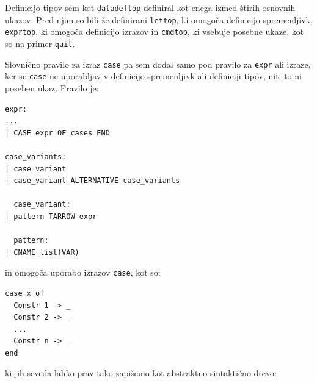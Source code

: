 \documentclass[a4paper,12pt,openright]{book}
\begin{document}
Definicijo tipov sem kot \lstinline{datadeftop} definiral kot enega izmed štirih osnovnih ukazov. Pred njim so bili že definirani \lstinline{lettop}, ki omogoča definicijo 
spremenljivk, \lstinline{exprtop}, ki omogoča definicijo izrazov in \lstinline{cmdtop}, ki vsebuje posebne ukaze, kot so na primer \lstinline{quit}.

Slovnično pravilo za izraz \lstinline{case} pa sem dodal samo pod pravilo za \lstinline{expr} ali izraze, ker se \lstinline{case} ne uporabljav v definicijo spremenljivk ali
definiciji tipov, niti to ni poseben ukaz. Pravilo je: 
\begin{lstlisting}
expr:
...
| CASE expr OF cases END

case_variants:
| case_variant
| case_variant ALTERNATIVE case_variants

  case_variant:
| pattern TARROW expr

  pattern:
| CNAME list(VAR)
\end{lstlisting}
in omogoča uporabo izrazov \lstinline{case}, kot so:
\begin{lstlisting}
case x of 
  Constr 1 -> _
  Constr 2 -> _
  ...
  Constr n -> _
end
\end{lstlisting}
ki jih seveda lahko prav tako zapišemo kot abstraktno sintaktično drevo:
\begin{center}
\end{center}
\end{document}
